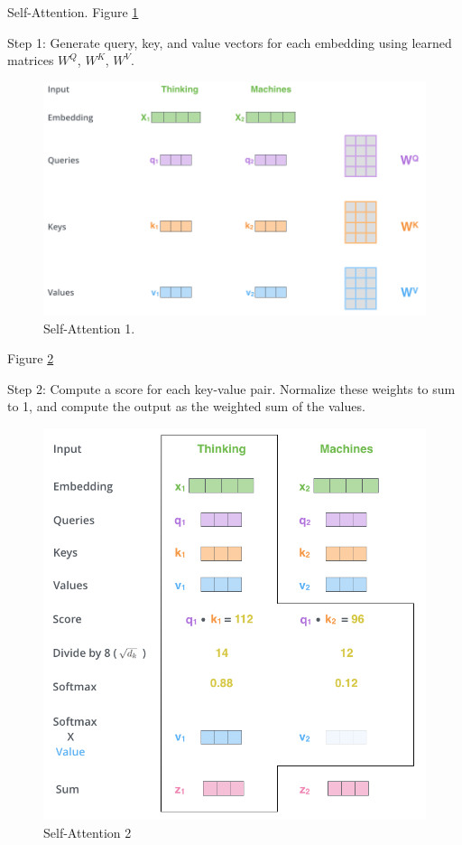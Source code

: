 \documentclass[english]{article}
\begin{document}
\item 
 {Self-Attention}.  Figure \ref{Self-Attention 1}

Step 1: Generate query, key, and value vectors for each embedding using learned matrices $W^Q$, $W^K$, $W^V$.
\begin{figure}
\centering
\includegraphics[height=0.5\linewidth]{self-attention1.png}
    \caption{Self-Attention 1.}
    \label{Self-Attention 1}
\end{figure}
 


\item  Figure \ref{Self-Attention 2}

Step 2: Compute a score for each key-value pair. Normalize these weights to sum to 1, and compute the output as the weighted sum of the values.
\begin{figure}
\centering
\includegraphics[height=0.55\linewidth]{self-attention2.png}
    \caption{Self-Attention 2}
    \label{Self-Attention 2}
\end{figure}
 
\end{document}
